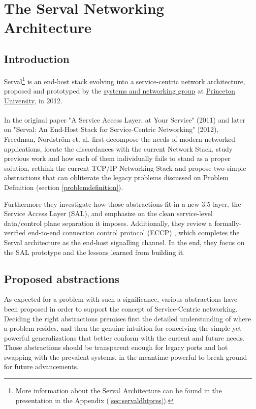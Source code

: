 \newpage
\section{The Serval Networking Architecture}
\subsection{Introduction}
Serval\footnote{More information about the Serval Architecture can be found in the presentation in the Appendix (\ref{sec:servaldhtpres}).} is an end-host stack evolving into a service-centric network architecture, proposed and prototyped by the \href{https://sns.cs.princeton.edu/}{systems and networking group} at \href{https://www.princeton.edu}{Princeton University}, in 2012.



\paragraph{} In the original paper "A Service Access Layer, at Your Service" (2011)\cite{Freedman2011} and later on "Serval: An End-Host Stack for Service-Centric Networking" (2012)\cite{Nordstrom2012}, Freedman, Nordstr{\"o}m et. al. first decompose the needs of modern networked applications, locate the discordances with the current Network Stack, study previous work and how each of them individually fails to stand as a proper solution, rethink the current TCP/IP Networking Stack and propose two simple abstractions that can obliterate the legacy problems discussed on Problem Definition (section \ref{problemdefinition}).

Furthermore they investigate how those abstractions fit in a new 3.5 layer, the Service Access Layer (SAL), and emphasize on the clean service-level data/control plane separation it imposes.
Additionally, they review a formally-verified end-to-end connection control protocol (ECCP) , which completes the Serval architecture as the end-host signalling channel. 
In the end, they focus on the SAL prototype and the lessons learned from building it.



\subsection{Proposed abstractions}
As expected for a problem with such a significance, various abstractions have been proposed in order to support the concept of Service-Centric networking.
Deciding the right abstractions premises first the detailed understanding of where a problem resides, and then the genuine intuition for conceiving the simple yet powerful generalizations that better conform with the current and future needs.
Those abstractions should be transparent enough for legacy ports and hot swapping with the prevalent systems, in the meantime powerful to break ground for future advancements.

